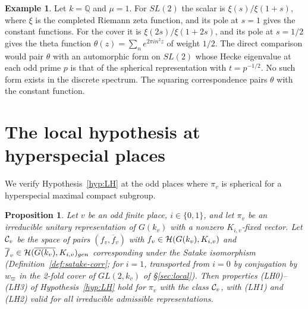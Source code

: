 \documentclass[12pt,letterpaper,openany]{book}
\theoremstyle{plain}
\newtheorem{proposition}[theorem]{Proposition}
\theoremstyle{definition}
\newtheorem{example}[theorem]{Example}
\theoremstyle{remark}
\theoremstyle{remark}
\begin{document}
\begin{example}
Let $k={\mathbb Q}$ and $\mu=1$. For $SL(2)$ the scalar is
$\xi(s)/\xi(1+s)$, where $\xi$ is the completed Riemann zeta function, and
its pole at $s=1$ gives the constant functions. For the cover it is
$\xi(2s)/\xi(1+2s)$, and its pole at $s=1/2$ gives the theta function
$\theta(z)=\sum_ne^{2\pi in^2z}$ of weight $1/2$. The direct comparison
would pair $\theta$ with an automorphic form on $SL(2)$ whose Hecke
eigenvalue at each odd prime $p$ is that of the spherical representation
with $t=p^{-1/2}$. No such form exists in the discrete spectrum. The
squaring correspondence pairs $\theta$ with the constant function.
\end{example}

\section{The local hypothesis at hyperspecial places}

We verify Hypothesis~\ref{hyp:LH} at the odd places where $\pi_v$ is
spherical for a hyperspecial maximal compact subgroup.

\begin{proposition}\label{prop:LH-spherical}
Let $v$ be an odd finite place, $i\in\{0,1\}$, and let $\pi_v$ be an
irreducible unitary representation of $G(k_v)$ with a nonzero
$K_{i,v}$-fixed vector. Let ${\cal C}_v$ be the space of pairs
$(f_v,\overline{f}_v)$ with $f_v\in{\cal H}(G(k_v),K_{i,v})$ and
$\overline{f}_v\in{\cal H}(\overline{G(k_v)},K_{i,v})_{gen}$
corresponding under the Satake isomorphism (Definition~\ref{def:satake-corr};
for $i=1$, transported from $i=0$ by conjugation by $w_\varpi$ in the
2-fold cover of $GL(2,k_v)$ of \S\ref{sec:local}). Then properties
(LH0)--(LH3) of Hypothesis~\ref{hyp:LH} hold for $\pi_v$ with the class
${\cal C}_v$, with (LH1) and (LH2) valid for all irreducible admissible
representations.
\end{proposition}
\end{document}
